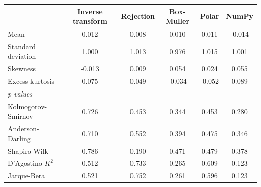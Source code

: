 \begin{tabular}{lccccc}
\toprule
 & Inverse transform & Rejection & Box-Muller & Polar & NumPy \\
\midrule
Mean & 0.012 & 0.008 & 0.010 & 0.011 & -0.014 \\
Standard deviation & 1.000 & 1.013 & 0.976 & 1.015 & 1.001 \\
Skewness & -0.013 & 0.009 & 0.054 & 0.024 & 0.055 \\
Excess kurtosis & 0.075 & 0.049 & -0.034 & -0.052 & 0.089 \\
\multicolumn{6}{l}{\textit{p-values}} \\
Kolmogorov-Smirnov & 0.726 & 0.453 & 0.344 & 0.453 & 0.280 \\
Anderson-Darling & 0.710 & 0.552 & 0.394 & 0.475 & 0.346 \\
Shapiro-Wilk & 0.786 & 0.190 & 0.471 & 0.479 & 0.378 \\
D'Agostino $K^2$ & 0.512 & 0.733 & 0.265 & 0.609 & 0.123 \\
Jarque-Bera & 0.521 & 0.752 & 0.261 & 0.596 & 0.123 \\
\bottomrule
\end{tabular}
